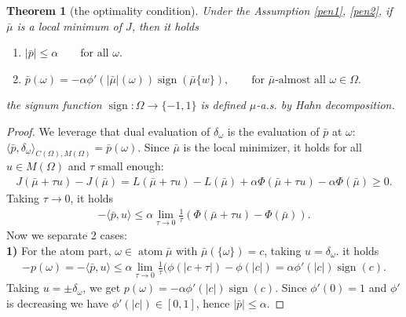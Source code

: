 \documentclass[12pt,fleqn]{amsart}
\newtheorem{theorem}{Theorem}[section]
\theoremstyle{definition}
\DeclareMathOperator*{\atom}{atom}
\DeclareMathOperator*{\sign}{sign}
\begin{document}
 
\begin{theorem}[the optimality condition]
\label{opt_cdt}
	Under the Assumption \ref{pen1}, \ref{pen2}, if $\bar{\mu}$ is a local minimum of $J$, then it holds
	\begin{enumerate}
		\item $|\bar{p}| \le \alpha \qquad \text{for all } \omega$.
		\item $\bar{p}(\omega) = -\alpha \phi'(|\bar{\mu}|(\omega)) \sign(\bar{\mu}\{ w \}), \qquad \text{for } \bar{\mu}\text{-almost all } \omega \in \Omega.$
	\end{enumerate}
	the signum function $\sign: \Omega \rightarrow \{-1, 1\}$ is defined $\mu$-a.s. by Hahn decomposition. 
\end{theorem}
\begin{proof} 
We leverage that dual evaluation of $\delta_\omega$ is the evaluation of $\bar{p}$ at $\omega$: $\langle \bar{p}, \delta_\omega\rangle_{C(\Omega), M(\Omega)}= \bar{p}(\omega)$. 
Since $\bar{\mu}$ is the local minimizer, it holds for all $u \in M(\Omega)$ and $\tau$ small enough:
\begin{align*}
	J(\bar{\mu} + \tau u) - J(\bar{\mu}) = L(\bar{\mu} + \tau u) - L(\bar{\mu}) + \alpha \Phi(\bar{\mu} + \tau u) - \alpha \Phi(\bar{\mu}) \ge 0.
\end{align*}
Taking $\tau \rightarrow 0$, it holds
\begin{align*}
	-\langle \bar{p}, u\rangle \le \alpha \lim_{ \tau \rightarrow 0} \frac{1}{\tau} (\Phi(\bar{\mu} + \tau u) - \Phi(\bar{\mu}) ). 
\end{align*}
Now we separate 2 cases:
\quad\\
\textbf{1)} For the atom part,  $\omega \in \atom \bar{\mu} $ with $\bar{\mu}(\{\omega\}) = c$, taking $u = \delta_\omega$.
it holds
\begin{align*}
	- p(\omega) =  -\langle \bar{p}, u \rangle \le \alpha \lim_{\tau \rightarrow 0} \frac{1}{\tau} (\phi (|c + \tau|) - \phi(|c|) = \alpha \phi'(|c|) \sign(c).  
\end{align*}
Taking $u = \pm \delta_\omega$, we get $p(\omega) = -\alpha \phi'(|c|) \sign(c)$. 
Since $\phi'(0) = 1$ and $\phi'$ is decreasing we have $\phi'(|c|) \in [0, 1]$, hence $|\bar{p}| \le \alpha$. 


\end{proof}
\end{document}
